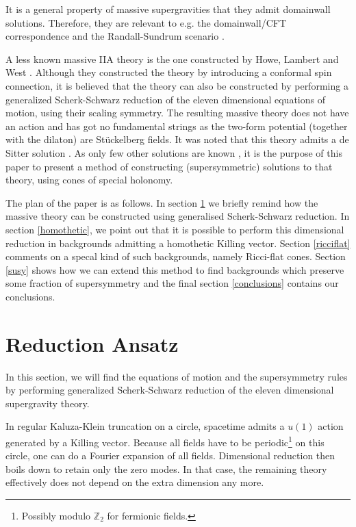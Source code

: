 \documentclass[a4paper,12pt]{article}
\begin{document}
It is a general property of massive supergravities that they admit domainwall solutions. Therefore, they are relevant to e.g. the domainwall/CFT correspondence \cite{Boonstra:1998mp,Behrndt:1999mk} and the Randall-Sundrum scenario \cite{Randall:1999ee,Randall:1999vf}.

A less known massive IIA theory is the one constructed by Howe, Lambert and West \cite{Howe:1998qt}. Although they constructed the theory by introducing a conformal spin connection, it is believed  \cite{Lavrinenko:1998qa} that the theory can also be constructed by performing a generalized Scherk-Schwarz reduction \cite{Scherk:1979zr} of the eleven dimensional equations of motion, using their scaling symmetry. The resulting massive theory does not have an action and has got no fundamental strings as the two-form potential (together with the dilaton) are St\"uckelberg fields. It was noted that this theory admits a de Sitter solution \cite{Lavrinenko:1998qa}. As only few other solutions are known \cite{Howe:1998qt,Chamblin:1999ea,Bergshoeff:2002nv,Chamblin}, it is the purpose of this paper to present a method of constructing (supersymmetric) solutions to that theory, using cones of special holonomy.

The plan of the paper is as follows. In section \ref{ansatz} we briefly remind how the massive theory can be constructed using generalised Scherk-Schwarz reduction. In section \ref{homothetic}, we point out that it is possible to perform this dimensional reduction in backgrounds admitting a homothetic Killing vector. Section \ref{ricciflat} comments on a specal kind of such backgrounds, namely Ricci-flat cones. Section \ref{susy} shows how we can extend this method to find backgrounds which preserve some fraction of supersymmetry and the final section \ref{conclusions} contains our conclusions. 
\section{Reduction Ansatz} \label{ansatz}
In this section, we will find the equations of motion and the supersymmetry rules by performing generalized
Scherk-Schwarz reduction of the eleven dimensional supergravity theory.

In regular Kaluza-Klein truncation on a circle, spacetime admits a $u(1)$ action generated by a Killing vector. Because all fields have to be periodic\footnote{Possibly modulo $\mathbb{Z}_2$ for fermionic fields.} on this circle, one can do a Fourier expansion of all fields. Dimensional reduction then boils down to retain only the zero modes. In that case, the remaining theory effectively does not depend on the extra dimension any more.
\end{document}

